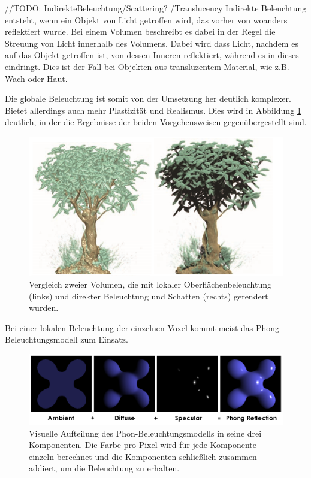 //TODO:
IndirekteBeleuchtung/Scattering? /Translucency  
Indirekte Beleuchtung entsteht, wenn ein Objekt von Licht getroffen wird, das vorher von woanders reflektiert wurde. Bei einem Volumen beschreibt es dabei in der Regel die Streuung von Licht innerhalb des Volumens. Dabei wird dass Licht, nachdem es auf das Objekt getroffen ist, von dessen Inneren reflektiert, während es in dieses eindringt. Dies ist der Fall bei Objekten aus transluzentem Material, wie z.B. Wach oder Haut.

Die globale Beleuchtung ist somit von der Umsetzung her deutlich komplexer. Bietet allerdings auch mehr Plastizität und Realismus. Dies wird in Abbildung \ref{img:localGlobalIll} deutlich, in der die Ergebnisse der beiden Vorgehensweisen gegenübergestellt sind.

\begin{figure}
	\centering
	\includegraphics[width=0.7\linewidth]{images/localGlobalIllumination.png}
	\caption{Vergleich zweier Volumen, die mit lokaler Oberflächenbeleuchtung (links) und direkter Beleuchtung und Schatten (rechts) gerendert wurden. \cite{Hadwiger06}}
	\label{img:localGlobalIll}
\end{figure}

Bei einer lokalen Beleuchtung der einzelnen Voxel kommt meist das Phong-Beleuchtungsmodell zum Einsatz. 

\begin{figure}
	\centering
	\includegraphics[width=0.7\linewidth]{images/Phong_components_version_4.png}
	\caption{Visuelle Aufteilung des Phon-Beleuchtungsmodells in seine drei Komponenten. Die Farbe pro Pixel wird für jede Komponente einzeln berechnet und die Komponenten schließlich zusammen addiert, um die Beleuchtung zu erhalten. }
	\label{img:phong}
\end{figure}

